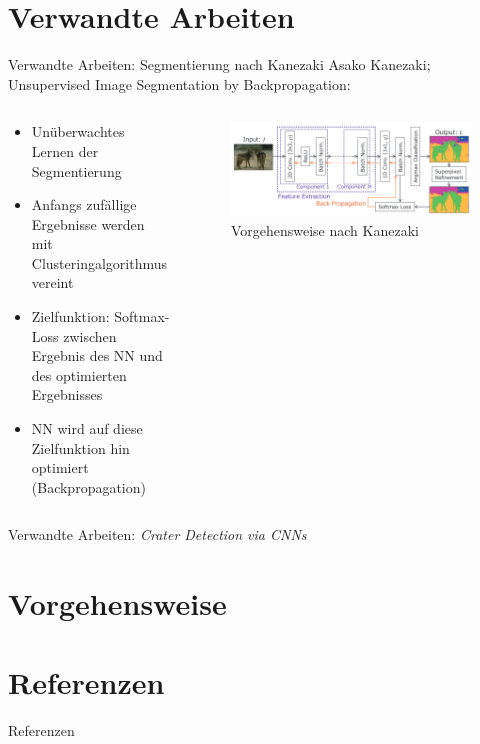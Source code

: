 \documentclass[aspectratio=169]{beamer}
\begin{document}
\section{Verwandte Arbeiten}

\begin{frame}{Verwandte Arbeiten: Segmentierung nach Kanezaki\cite{kanezaki2018_unsupervised_segmentation}}
Asako Kanezaki; Unsupervised Image Segmentation by Backpropagation\cite{kanezaki2018_unsupervised_segmentation}:
\begin{columns}
	\begin{column}{.5\textwidth}
		\begin{itemize}
			\item Unüberwachtes Lernen der Segmentierung
			\item Anfangs zufällige Ergebnisse werden mit Clusteringalgorithmus vereint
			\item Zielfunktion: Softmax-Loss zwischen Ergebnis des NN und des optimierten Ergebnisses
			\item NN wird auf diese Zielfunktion hin optimiert (Backpropagation)
		\end{itemize}
	\end{column}
	\begin{column}{.5\textwidth}
		\begin{figure}
			\includegraphics[width=\textwidth,keepaspectratio]{kanezaki.png}
			\caption{Vorgehensweise nach Kanezaki\cite{kanezaki2018_unsupervised_segmentation}}
		\end{figure}
	\end{column}
\end{columns}
\end{frame}

\begin{frame}{Verwandte Arbeiten: \textit{Crater Detection via CNNs}\cite{2016arXiv160100978C}}
	
\end{frame}

\section{Vorgehensweise}

\section{Referenzen}

\begin{frame}[shrink=30]{Referenzen}
	
	
\end{frame}

	
\end{document}
